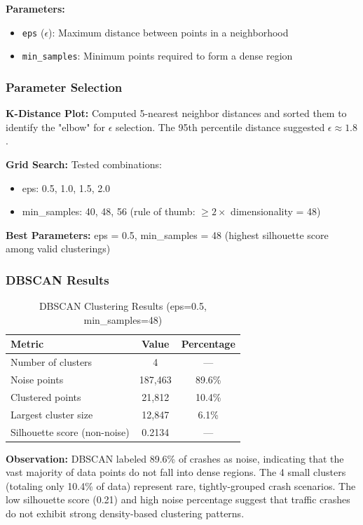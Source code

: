 \documentclass[12pt,man]{apa7}
\begin{document}
\textbf{Parameters:}
\begin{itemize}
    \item \texttt{eps} ($\epsilon$): Maximum distance between points in a neighborhood
    \item \texttt{min\_samples}: Minimum points required to form a dense region
\end{itemize}

\subsubsection{Parameter Selection}

\textbf{K-Distance Plot:} Computed 5-nearest neighbor distances and sorted them to identify the "elbow" for $\epsilon$ selection. The 95th percentile distance suggested $\epsilon \approx 1.8$.

\textbf{Grid Search:} Tested combinations:
\begin{itemize}
    \item eps: 0.5, 1.0, 1.5, 2.0
    \item min\_samples: 40, 48, 56 (rule of thumb: $\geq 2 \times$ dimensionality = 48)
\end{itemize}

\textbf{Best Parameters:} eps = 0.5, min\_samples = 48 (highest silhouette score among valid clusterings)

\subsubsection{DBSCAN Results}

\begin{table}[H]
\centering
\caption{DBSCAN Clustering Results (eps=0.5, min\_samples=48)}
\begin{tabular}{lcc}
\toprule
\textbf{Metric} & \textbf{Value} & \textbf{Percentage} \\
\midrule
Number of clusters & 4 & --- \\
Noise points & 187,463 & 89.6\% \\
Clustered points & 21,812 & 10.4\% \\
Largest cluster size & 12,847 & 6.1\% \\
Silhouette score (non-noise) & 0.2134 & --- \\
\bottomrule
\end{tabular}
\end{table}

\textbf{Observation:} DBSCAN labeled 89.6\% of crashes as noise, indicating that the vast majority of data points do not fall into dense regions. The 4 small clusters (totaling only 10.4\% of data) represent rare, tightly-grouped crash scenarios. The low silhouette score (0.21) and high noise percentage suggest that traffic crashes do not exhibit strong density-based clustering patterns.
\end{document}
